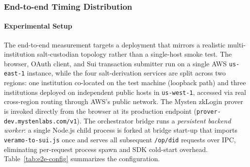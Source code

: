 %
%
%

\subsubsection{End-to-end Timing Distribution}
\label{sec:e2e-timing}

\paragraph{Experimental Setup}
\label{sec:e2e-setup}

The end-to-end measurement targets a deployment that mirrors a realistic
multi-institution salt-custodian topology rather than a single-host
smoke test. The browser, OAuth client, and Sui transaction submitter run
on a single AWS \texttt{us-east-1} instance, while the four
salt-derivation services are split across two regions: one institution
co-located on the test machine (loopback path) and three institutions
deployed on independent public hosts in \texttt{us-west-1}, accessed via
real cross-region routing through AWS's public network. The Mysten
zkLogin prover is invoked directly from the browser at its production
endpoint (\texttt{prover-dev.mystenlabs.com/v1}). The orchestrator
bridge runs a \emph{persistent backend worker}: a single Node.js child
process is forked at bridge start-up that imports
\texttt{veramo-to-sui.js} once and serves all subsequent
\texttt{/op/did} requests over IPC, eliminating per-request process
spawn and SDK cold-start overhead. Table~\ref{tab:e2e-config} summarizes
the configuration.

